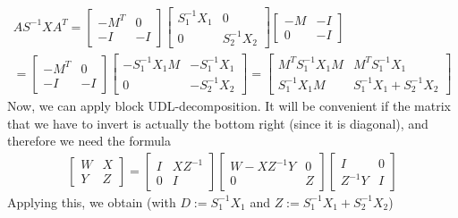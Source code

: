 \documentclass{article}
\begin{document}
\begin{align}
		AS^{-1}XA^T = 
		\begin{bmatrix}
				-M^T & 0\\
				-I & -I
		\end{bmatrix}
		\begin{bmatrix}
				S_1^{-1}X_1 & 0\\
				0 & S_2^{-1}X_2
		\end{bmatrix}
		\begin{bmatrix}
				-M & -I\\
				0 & -I
		\end{bmatrix}\\
		= 
		\begin{bmatrix}
				-M^T & 0\\
				-I & -I
		\end{bmatrix}
		\begin{bmatrix}
				-S_1^{-1}X_1M & -S_1^{-1}X_1\\
				0 & -S_2^{-1} X_2
		\end{bmatrix}
		= 
		\begin{bmatrix}
				M^TS_1^{-1}X_1M & M^TS_1^{-1}X_1\\
				S_1^{-1} X_1 M & S_1^{-1}X_1 + S_2^{-1}X_2
		\end{bmatrix}
\end{align}
Now, we can apply block UDL-decomposition. It will be convenient if the matrix that we have to invert is actually the bottom right (since it is diagonal), and therefore we need the formula 
\begin{align}
		\begin{bmatrix}
				W & X\\
				Y & Z
		\end{bmatrix}
		=
		\begin{bmatrix}
				I & XZ^{-1}\\
				0 & I
		\end{bmatrix}
		\begin{bmatrix}
				W - XZ^{-1}Y & 0\\
				0 & Z
		\end{bmatrix}
		\begin{bmatrix}
				I & 0\\
				Z^{-1}Y & I
		\end{bmatrix}
\end{align}
Applying this, we obtain (with $D := S_1^{-1}X_1$ and $Z := S_1^{-1}X_1 + S_2^{-1}X_2$)
\end{document}
